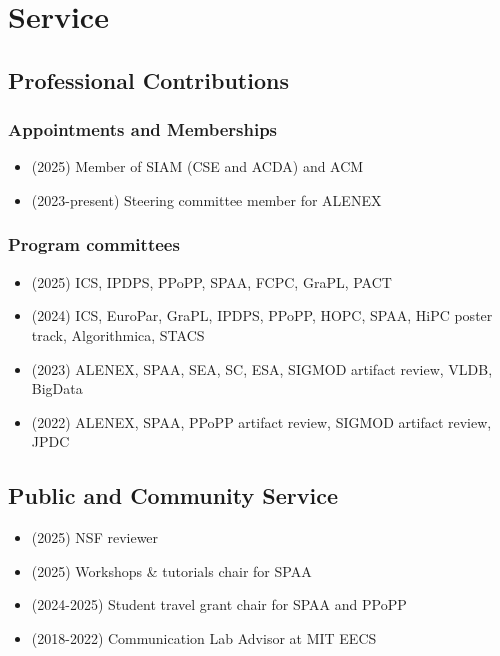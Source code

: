\section{Service}
\begin{adjustwidth}{2em}{0pt}

\subsection{Professional Contributions}

\subsubsection{Appointments and Memberships}

\begin{itemize}
    \item (2025) Member of SIAM (CSE and ACDA) and ACM
    \item (2023-present) Steering committee member for ALENEX
\end{itemize}

\subsubsection{Program committees}

\begin{itemize}
    \item (2025) ICS, IPDPS, PPoPP, SPAA, FCPC, GraPL, PACT
    \item (2024) ICS, EuroPar, GraPL, IPDPS, PPoPP, HOPC, SPAA, HiPC poster
    track, Algorithmica, STACS
    \item (2023) ALENEX, SPAA, SEA, SC, ESA, SIGMOD artifact review, VLDB, BigData
    \item (2022) ALENEX, SPAA, PPoPP artifact review, SIGMOD artifact review,
    JPDC
\end{itemize}

\subsection{Public and Community Service}

\begin{itemize}
\item (2025) NSF reviewer
 \item (2025) Workshops \& tutorials chair for SPAA
 \item (2024-2025) Student travel grant chair for SPAA and PPoPP
    \item (2018-2022) Communication Lab Advisor at MIT EECS
\end{itemize}


\end{adjustwidth}
